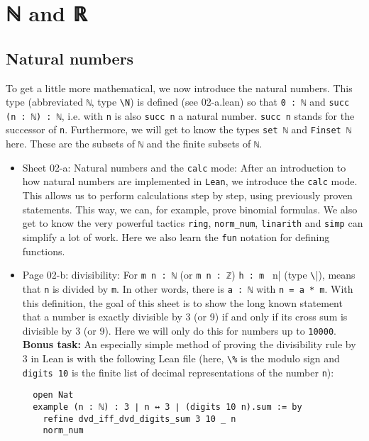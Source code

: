 \documentclass{memoir}
\begin{document}
\chapter{ℕ and ℝ}



\section{Natural numbers}

To get a little more mathematical, we now introduce the natural numbers. This type (abbreviated \Verb|ℕ|, type \Verb|\N|) is defined (see 02-a.lean) so that \Verb|0 : ℕ| and \Verb|succ (n : ℕ) : ℕ|, i.e. with \Verb|n| is also \Verb|succ n| a natural number. \Verb|succ n| stands for the successor of \Verb|n|. Furthermore, we will get to know the types \Verb|set ℕ| and \Verb|Finset ℕ| here. These are the subsets of \Verb|ℕ| and the finite subsets of \Verb|ℕ|.

\begin{itemize}
\item Sheet 02-a: Natural numbers and the \Verb|calc| mode:
    After an introduction to how natural numbers are implemented in \Verb|Lean|, we introduce the \Verb|calc| mode. This allows us to perform calculations step by step, using previously proven statements. This way, we can, for example, prove binomial formulas. We also get to know the very powerful tactics \Verb|ring|, \Verb|norm_num|, \Verb|linarith| and \Verb|simp| can simplify a lot of work. Here we also learn the \Verb|fun| notation for defining functions.\item Page 02-b: divisibility:
    For \Verb|m n : ℕ| (or \Verb|m n : ℤ|) \Verb|h : m | n| (type \Verb|\||), means that \Verb|n| is divided by \Verb|m|. In other words, there is \Verb|a : ℕ| with \Verb|n = a * m|. With this definition, the goal of this sheet is to show the long known statement that a number is exactly divisible by 3 (or 9) if and only if its cross sum is divisible by 3 (or 9). Here we will only do this for numbers up to \Verb|10000|.
\textbf{Bonus task:} An especially simple method of proving the divisibility rule by 3 in Lean is with the following Lean file (here, \Verb|\%| is the modulo sign and \Verb|digits 10| is the finite list of decimal representations of the
  number \Verb|n|):\begin{verbatim}
  open Nat
  example (n : ℕ) : 3 ∣ n ↔ 3 ∣ (digits 10 n).sum := by
    refine dvd_iff_dvd_digits_sum 3 10 _ n
    norm_num

\end{verbatim}

\end{itemize}
\end{document}
